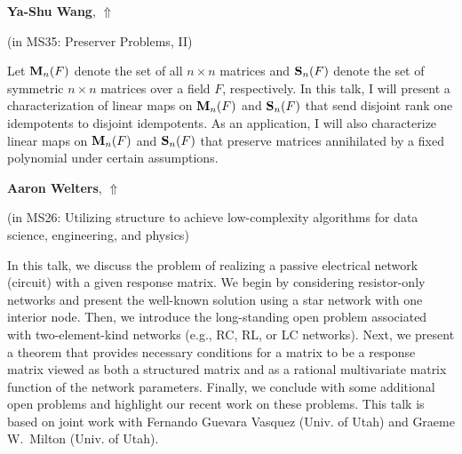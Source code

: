 \documentclass[ILAS2025-program.tex]{subfiles}
\begin{document}
\hypertarget{down0316}{}\begin{ilasabstract}
    
\textbf{Ya-Shu Wang},  \hfill \hyperlink{up0316}{$\Uparrow$}
    
    
(in {\color{mstitle}MS35: Preserver Problems, II})
        
\mtskip
    Let ${\bf M}_n(F)$ denote the set of all $n \times n$ matrices and ${\bf S}_n(F)$ denote the set of symmetric $n \times n$ matrices over a field $F$, respectively.
In this talk, I will present a characterization of linear maps on ${\bf M}_n(F)$ and ${\bf S}_n(F)$ that send disjoint rank one idempotents to disjoint idempotents. As an application,  I will also characterize linear maps on ${\bf M}_n(F)$ and ${\bf S}_n(F)$ that preserve matrices annihilated by a fixed polynomial under certain assumptions.

\end{ilasabstract}
    

\hypertarget{down0058}{}\begin{ilasabstract}
    
\textbf{Aaron Welters},  \hfill \hyperlink{up0058}{$\Uparrow$}
    
    
(in {\color{mstitle}MS26: Utilizing structure to achieve low-complexity algorithms for data science, engineering, and physics})
        
\mtskip
    In this talk, we discuss the problem of realizing a passive electrical network (circuit) with a given response matrix. We begin by considering resistor-only networks and present the well-known solution using a star network with one interior node. Then, we introduce the long-standing open problem associated with two-element-kind networks (e.g., RC, RL, or LC networks). Next, we present a theorem that provides necessary conditions for a matrix to be a response matrix viewed as both a structured matrix and as a rational multivariate matrix function of the network parameters. Finally, we conclude with some additional open problems and highlight our recent work on these problems. This talk is based on joint work with Fernando Guevara Vasquez (Univ. of Utah) and Graeme W.\ Milton (Univ. of Utah).  

\end{ilasabstract}
    
\end{document}
